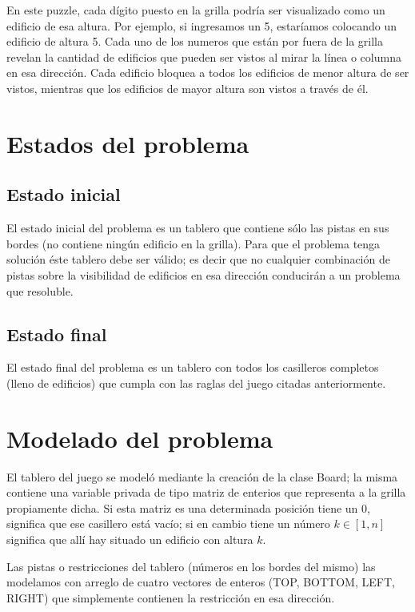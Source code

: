 \documentclass[%
	final,
	reprint,
	notitlepage,
	narroweqnarray,
	inline,
	twoside,
	invited
	]{ieee}
\begin{document}
\par En este puzzle, cada dígito puesto en la grilla podría ser visualizado como un edificio de esa altura. Por ejemplo, si ingresamos un 5, estaríamos colocando un edificio de altura 5. Cada uno de los numeros que están por fuera de la grilla revelan la cantidad de edificios que pueden ser vistos al mirar la línea o columna en esa dirección. Cada edificio bloquea a todos los edificios de menor altura de ser vistos, mientras que los edificios de mayor altura son vistos a través de él.


\section{Estados del problema}

\subsection{Estado inicial}

\par El estado inicial del problema es un tablero que contiene sólo las pistas en sus bordes (no contiene ningún edificio en la grilla). Para que el problema tenga solución éste tablero debe ser válido; es decir que no cualquier combinación de pistas sobre la visibilidad de edificios en esa dirección conducirán a un problema que resoluble.

\subsection{Estado final}

\par El estado final del problema es un tablero con todos los casilleros completos (lleno de edificios) que cumpla con las raglas del juego citadas anteriormente.

\section{Modelado del problema}

\par El tablero del juego se modeló mediante la creación de la clase Board; la misma contiene una variable privada de tipo matriz de enterios que representa a la grilla propiamente dicha. Si esta matriz es una determinada posición tiene un $0$, significa que ese casillero está vacío; si en cambio tiene un número $k \in [1,n]$ significa que allí hay situado un edificio con altura $k$.\\
\par Las pistas o restricciones del tablero (números en los bordes del mismo) las modelamos con arreglo de cuatro vectores de enteros (TOP, BOTTOM, LEFT, RIGHT) que simplemente contienen la restricción en esa dirección.\\
\end{document}
